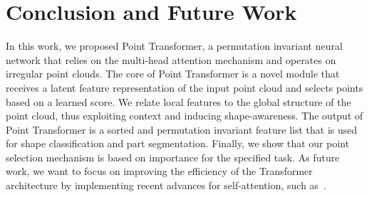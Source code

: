 \documentclass{ieeeaccess}
\begin{document}
\section{Conclusion and Future Work}\label{seq:06_conclusion}
In this work, we proposed Point Transformer, a permutation invariant neural network that relies on the multi-head attention mechanism and operates on irregular point clouds. The core of Point Transformer is a novel module that receives a latent feature representation of the input point cloud and selects points based on a learned score. We relate local features to the global structure of the point cloud, thus exploiting context and inducing shape-awareness. The output of Point Transformer is a sorted and permutation invariant feature list that is used for shape classification and part segmentation. Finally, we show that our point selection mechanism is based on importance for the specified task.
As future work, we want to focus on improving the efficiency of the Transformer architecture by implementing recent advances for self-attention, such as~\cite{wang2020linformer, xiong2021nystr}. 
\end{document}
